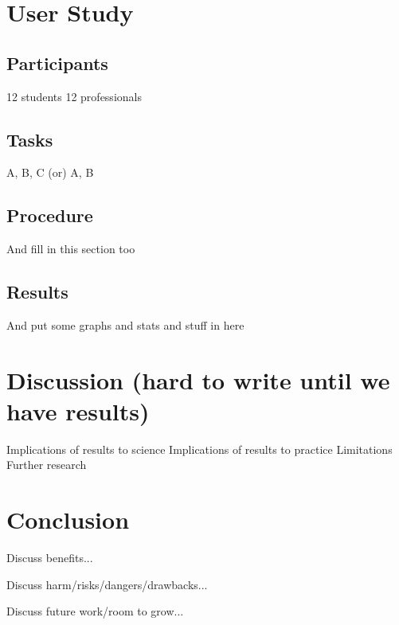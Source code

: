 \documentclass{sigchi}
\begin{document}
\section{User Study}
\subsection{Participants}
12 students
12 professionals

\subsection{Tasks}
A, B, C (or) A, B

\subsection{Procedure}
And fill in this section too

\subsection{Results}
And put some graphs and stats and stuff in here

\section{Discussion (hard to write until we have results)}
Implications of results to science
Implications of results to practice 
Limitations
Further research 


\section{Conclusion}
Discuss benefits...

Discuss harm/risks/dangers/drawbacks...

Discuss future work/room to grow...







\balance{}



\end{document}
